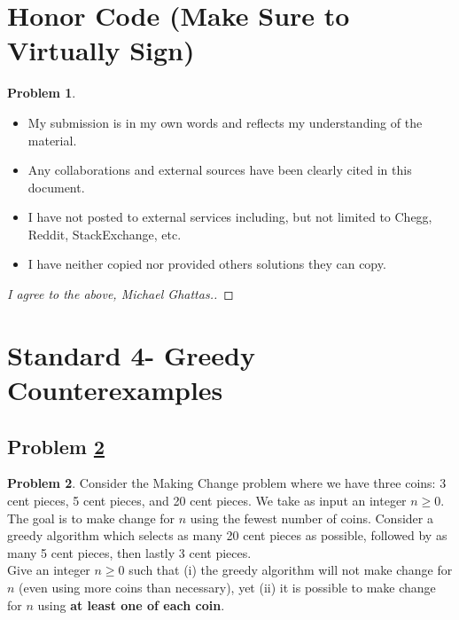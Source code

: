 \documentclass[11pt]{article}
\theoremstyle{definition}
\theoremstyle{definition}
\newtheorem{required}{Problem}
\theoremstyle{definition}
\begin{document}
\section{Honor Code (Make Sure to Virtually Sign)} \label{HonorCode}

\begin{required}
\begin{itemize}
\item My submission is in my own words and reflects my understanding of the material.
\item Any collaborations and external sources have been clearly cited in this document.
\item I have not posted to external services including, but not limited to Chegg, Reddit, StackExchange, etc.
\item I have neither copied nor provided others solutions they can copy.
\end{itemize}

\end{required}

\begin{proof}[I agree to the above, Michael Ghattas.]
\end{proof}


\newpage
\section{Standard 4- Greedy Counterexamples}

\subsection{Problem \ref{prob}}
\begin{required} \label{prob}
Consider the Making Change problem where we have three coins: 3 cent pieces, 5 cent pieces, and 20 cent pieces. We take as input an integer $n \geq 0$. The goal is to make change for $n$ using the fewest number of coins. Consider a greedy algorithm which selects as many 20 cent pieces as possible, followed by as many 5 cent pieces, then lastly 3 cent pieces. \\

\noindent Give an integer $n \geq 0$ such that (i) the greedy algorithm will not make change for $n$ (even using more coins than necessary), yet (ii) it is possible to make change for $n$ using \textbf{at least one of each coin}.
\end{required}
\end{document}
